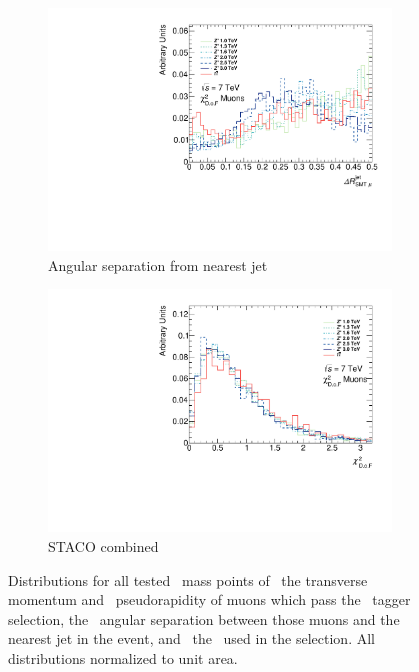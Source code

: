 \begin{figure}[htbp]
  \begin{subfigure}{0.48\textwidth}
    \includegraphics[width=\textwidth]{PartBoosted/Plots/h_smt_jet_dr.pdf}
    \caption{Angular separation from nearest jet}\label{fig:BoostedControlSMTdr}
  \end{subfigure}
  \begin{subfigure}{0.48\textwidth}
    \includegraphics[width=\textwidth]{PartBoosted/Plots/h_smt_chi2.pdf}
    \caption{STACO combined \xsd}\label{fig:BoostedControlSMTchi2}
  \end{subfigure}

  \caption[Distributions for all tested \Zprime\ mass points of the transverse momentum and pseudorapidity of muons which pass the \xsm\ tagger selection, the angular separation between those muons and the nearest jet in the event, and the \xsm\ used in the selection.]{Distributions for all tested \Zprime\ mass points of~ the transverse momentum and~ pseudorapidity of muons which pass the \xsm\ tagger selection, the~ angular separation between those muons and the nearest jet in the event, and~ the \xsm\ used in the selection. All distributions normalized to unit area.}\label{fig:BoostedControlSMT}
\end{figure}

